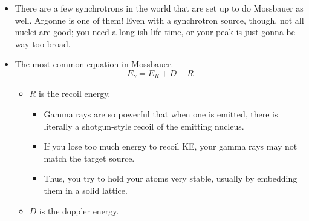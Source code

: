 \documentclass[../notes.tex]{subfiles}
\begin{document}
\begin{itemize}
\begin{table}[h!]
        \caption{Typical Mossbauer gamma ray source nuclei.}
        \label{tab:MossbauerSources}
    \end{table}
    \begin{itemize}
        \item 90\% or more of Mossbauer is done with .
        \begin{itemize}
            \item At \SI{14.4}{\kilo\electronvolt}, it's a pretty hot but not super hot $\gamma$ ray.
            \item The cobalt precursor nucleus comes from Russia, so a lot of Mossbauer spectroscopists are probably looking at very lean times right now.
        \end{itemize}
        \item {} is also pretty common.
        \begin{itemize}
            \item With respect to the precursor nucleus, 119m means a \textbf{metastable} state of tin.
        \end{itemize}
    \end{itemize}
    \item There are a few synchrotrons in the world that are set up to do Mossbauer as well. Argonne is one of them! Even with a synchrotron source, though, not all nuclei are good; you need a long-ish life time, or your peak is just gonna be way too broad.
    \item The most common equation in Mossbauer.
    \begin{equation*}
        E_\gamma = E_R+D-R
    \end{equation*}
    \begin{itemize}
        \item $R$ is the recoil energy.
        \begin{itemize}
            \item Gamma rays are so powerful that when one is emitted, there is literally a shotgun-style recoil of the emitting nucleus.
            \item If you lose too much energy to recoil KE, your gamma rays may not match the target source.
            \item Thus, you try to hold your atoms very stable, usually by embedding them in a solid lattice.
        \end{itemize}
        \item $D$ is the doppler energy.
        \begin{itemize}

\end{itemize}
\end{itemize}
\end{itemize}
\end{document}
